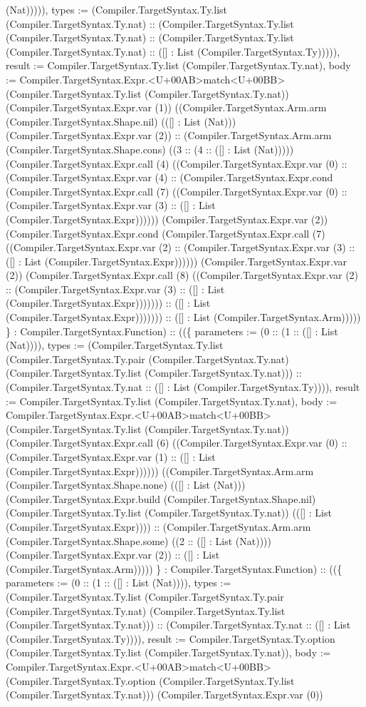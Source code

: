 \documentclass[11pt]{article}
\begin{document}
(Nat))))), types := (Compiler.TargetSyntax.Ty.list (Compiler.TargetSyntax.Ty.nat) :: (Compiler.TargetSyntax.Ty.list (Compiler.TargetSyntax.Ty.nat) :: (Compiler.TargetSyntax.Ty.list (Compiler.TargetSyntax.Ty.nat) :: ([] : List (Compiler.TargetSyntax.Ty))))), result := Compiler.TargetSyntax.Ty.list (Compiler.TargetSyntax.Ty.nat), body := Compiler.TargetSyntax.Expr.<U+00AB>match<U+00BB> (Compiler.TargetSyntax.Ty.list (Compiler.TargetSyntax.Ty.nat)) (Compiler.TargetSyntax.Expr.var (1)) ((Compiler.TargetSyntax.Arm.arm (Compiler.TargetSyntax.Shape.nil) (([] : List (Nat))) (Compiler.TargetSyntax.Expr.var (2)) :: (Compiler.TargetSyntax.Arm.arm (Compiler.TargetSyntax.Shape.cons) ((3 :: (4 :: ([] : List (Nat))))) (Compiler.TargetSyntax.Expr.call (4) ((Compiler.TargetSyntax.Expr.var (0) :: (Compiler.TargetSyntax.Expr.var (4) :: (Compiler.TargetSyntax.Expr.cond (Compiler.TargetSyntax.Expr.call (7) ((Compiler.TargetSyntax.Expr.var (0) :: (Compiler.TargetSyntax.Expr.var (3) :: ([] : List (Compiler.TargetSyntax.Expr)))))) (Compiler.TargetSyntax.Expr.var (2)) (Compiler.TargetSyntax.Expr.cond (Compiler.TargetSyntax.Expr.call (7) ((Compiler.TargetSyntax.Expr.var (2) :: (Compiler.TargetSyntax.Expr.var (3) :: ([] : List (Compiler.TargetSyntax.Expr)))))) (Compiler.TargetSyntax.Expr.var (2)) (Compiler.TargetSyntax.Expr.call (8) ((Compiler.TargetSyntax.Expr.var (2) :: (Compiler.TargetSyntax.Expr.var (3) :: ([] : List (Compiler.TargetSyntax.Expr))))))) :: ([] : List (Compiler.TargetSyntax.Expr))))))) :: ([] : List (Compiler.TargetSyntax.Arm))))) \} : Compiler.TargetSyntax.Function) :: ((\{ parameters := (0 :: (1 :: ([] : List (Nat)))), types := (Compiler.TargetSyntax.Ty.list (Compiler.TargetSyntax.Ty.pair (Compiler.TargetSyntax.Ty.nat) (Compiler.TargetSyntax.Ty.list (Compiler.TargetSyntax.Ty.nat))) :: (Compiler.TargetSyntax.Ty.nat :: ([] : List (Compiler.TargetSyntax.Ty)))), result := Compiler.TargetSyntax.Ty.list (Compiler.TargetSyntax.Ty.nat), body := Compiler.TargetSyntax.Expr.<U+00AB>match<U+00BB> (Compiler.TargetSyntax.Ty.list (Compiler.TargetSyntax.Ty.nat)) (Compiler.TargetSyntax.Expr.call (6) ((Compiler.TargetSyntax.Expr.var (0) :: (Compiler.TargetSyntax.Expr.var (1) :: ([] : List (Compiler.TargetSyntax.Expr)))))) ((Compiler.TargetSyntax.Arm.arm (Compiler.TargetSyntax.Shape.none) (([] : List (Nat))) (Compiler.TargetSyntax.Expr.build (Compiler.TargetSyntax.Shape.nil) (Compiler.TargetSyntax.Ty.list (Compiler.TargetSyntax.Ty.nat)) (([] : List (Compiler.TargetSyntax.Expr)))) :: (Compiler.TargetSyntax.Arm.arm (Compiler.TargetSyntax.Shape.some) ((2 :: ([] : List (Nat)))) (Compiler.TargetSyntax.Expr.var (2)) :: ([] : List (Compiler.TargetSyntax.Arm))))) \} : Compiler.TargetSyntax.Function) :: ((\{ parameters := (0 :: (1 :: ([] : List (Nat)))), types := (Compiler.TargetSyntax.Ty.list (Compiler.TargetSyntax.Ty.pair (Compiler.TargetSyntax.Ty.nat) (Compiler.TargetSyntax.Ty.list (Compiler.TargetSyntax.Ty.nat))) :: (Compiler.TargetSyntax.Ty.nat :: ([] : List (Compiler.TargetSyntax.Ty)))), result := Compiler.TargetSyntax.Ty.option (Compiler.TargetSyntax.Ty.list (Compiler.TargetSyntax.Ty.nat)), body := Compiler.TargetSyntax.Expr.<U+00AB>match<U+00BB> (Compiler.TargetSyntax.Ty.option (Compiler.TargetSyntax.Ty.list (Compiler.TargetSyntax.Ty.nat))) (Compiler.TargetSyntax.Expr.var (0)) 
\end{document}
